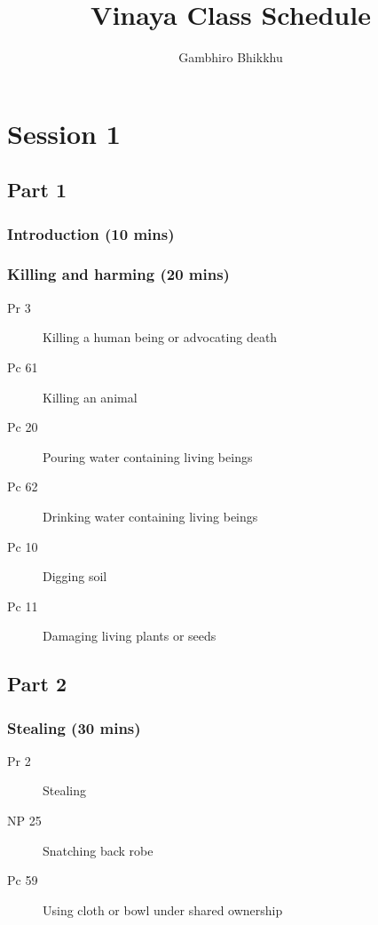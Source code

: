 \documentclass[11pt,oneside]{memoir}
\title{Vinaya Class Schedule}
\author{Gambhiro Bhikkhu}
\begin{document}
\chapter{Session 1}

\begin{multicols}{2}

\section{Part 1}

\subsection{Introduction (10 mins)}

\subsection{Killing and harming (20 mins)}

\begin{description}
\item[Pr 3] Killing a human being or advocating death
\item[Pc 61] Killing an animal
\item[Pc 20] Pouring water containing living beings
\item[Pc 62] Drinking water containing living beings
\item[Pc 10] Digging soil
\item[Pc 11] Damaging living plants or seeds
\end{description}

\columnbreak

\section{Part 2}

\subsection{Stealing (30 mins)}

\begin{description}
\item[Pr 2] Stealing
\item[NP 25] Snatching back robe
\item[Pc 59] Using cloth or bowl under shared ownership
\end{description}

\end{multicols}
\end{document}
